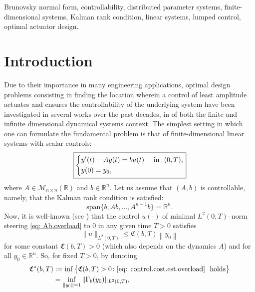 \documentclass[journal,twoside,web]{ieeecolor}
\newcommand{\R}{\mathbb{R}}
\begin{document}
\begin{IEEEkeywords}
Brunovsky normal form, controllability, distributed parameter systems, finite-dimensional systems, Kalman rank condition, linear systems, lumped control, optimal actuator design.
\end{IEEEkeywords}

\section{Introduction}
Due to their importance in many engineering applications, optimal design problems consisting in finding the location wherein a control of least amplitude actuates and ensures the controllability of the underlying system have been investigated in several works over the past decades, in of both the finite and infinite dimensional dynamical systems context. 
The simplest setting in which one can formulate the fundamental problem is that of finite-dimensional linear systems with scalar controls:
	\begin{equation} \label{eq: Ab.overload}
	\boxed{
	\begin{dcases}
	y'(t) - Ay(t) = bu(t) &\text{ in } (0,T), \\
	y(0) = y_0,
	\end{dcases}
	}
	\end{equation}
	where $A\in\mathcal{M}_{n\times n}(\R)$ and $b\in\R^{n}$. 
	Let us assume that $(A, b)$ is controllable, namely, that the Kalman rank condition is satisfied:
	\begin{equation} \label{eq: kalman.rank.condition}
	\text{span}\big\{b,Ab, \ldots, A^{n-1}b\big\} = \R^n.
	\end{equation}
	Now, it is well-known (see \cite{zuazua2007controllability}) that the control $u(\cdot)$ of minimal $L^2(0,T)$--norm steering \eqref{eq: Ab.overload} to $0$ in any given time $T>0$ satisfies
	\begin{equation} \label{eq: control.cost.est.overload}
	\|u\|_{L^2(0,T)} \leqslant \mathfrak{C}(b,T) \left\|y_0\right\|
	\end{equation}
	for some constant $\mathfrak{C}(b,T)>0$ (which also depends on the dynamics $A$) and for all $y_0\in\R^n$. So, for fixed $T>0$, by denoting
	\begin{align*}
	\mathfrak{C}^*(b,T) &:= \inf\big\{\mathfrak{C}(b,T)>0 \colon \eqref{eq: control.cost.est.overload} \text{ holds}\big\} \\
	&= \inf_{\|y_0\|=1} \|\Gamma_b(y_0)\|_{L^2(0,T)},
	\end{align*}
\end{document}
